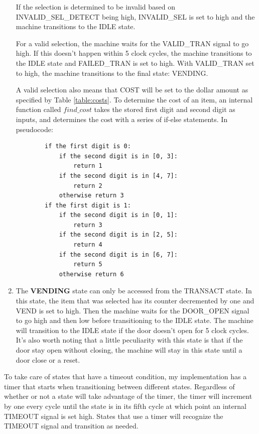 \documentclass{article}
\begin{document}
\begin{enumerate}
    If the selection is determined to be invalid based on INVALID\_SEL\_DETECT being high, INVALID\_SEL is set to high and the machine transitions to the IDLE state.

    For a valid selection, the machine waits for the VALID\_TRAN signal to go high. If this doesn't happen within 5 clock cycles, the machine transitions to the IDLE state and FAILED\_TRAN is set to high. With VALID\_TRAN set to high, the machine transitions to the final state: VENDING.

    A valid selection also means that COST will be set to the dollar amount as specified by Table \ref{table:costs}. To determine the cost of an item, an internal function called $find\_cost$ takes the stored first digit and second digit as inputs, and determines the cost with a series of if-else statements. In pseudocode:
    \begin{verbatim}
        if the first digit is 0:
            if the second digit is in [0, 3]:
                return 1
            if the second digit is in [4, 7]:
                return 2
            otherwise return 3
        if the first digit is 1:
            if the second digit is in [0, 1]:
                return 3
            if the second digit is in [2, 5]:
                return 4
            if the second digit is in [6, 7]:
                return 5
            otherwise return 6
    \end{verbatim}

    \item The \textbf{VENDING} state can only be accessed from the TRANSACT state. In this state, the item that was selected has its counter decremented by one and VEND is set to high. Then the machine waits for the DOOR\_OPEN signal to go high and then low before transitioning to the IDLE state. The machine will transition to the IDLE state if the door doesn't open for 5 clock cycles. It's also worth noting that a little peculiarity with this state is that if the door stay open without closing, the machine will stay in this state until a door close or a reset.
\end{enumerate}

To take care of states that have a timeout condition, my implementation has a timer that starts when transitioning between different states. Regardless of whether or not a state will take advantage of the timer, the timer will increment by one every cycle until the state is in its fifth cycle at which point an internal TIMEOUT signal is set high. States that use a timer will recognize the TIMEOUT signal and transition as needed.
\end{document}
